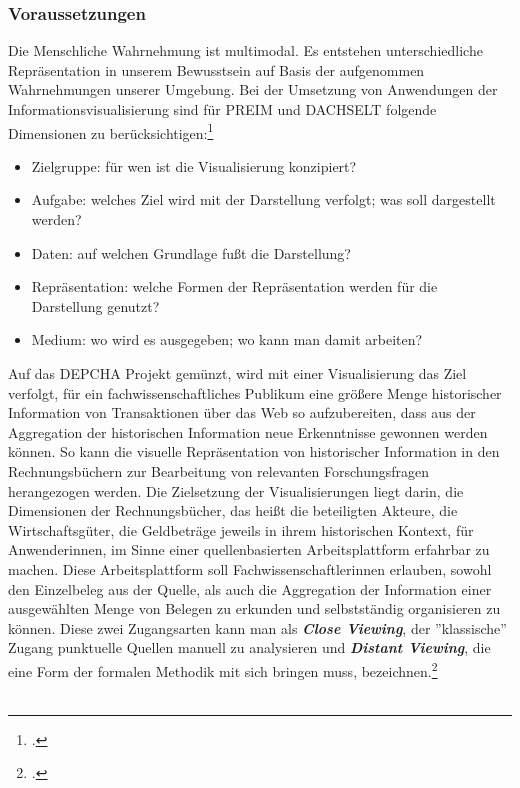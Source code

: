 \documentclass[12pt,a4paper]{article}
\begin{document}
\subsubsection{Voraussetzungen}

Die Menschliche Wahrnehmung ist multimodal. Es entstehen unterschiedliche Repräsentation in unserem Bewusstsein auf Basis der aufgenommen Wahrnehmungen unserer Umgebung. Bei der Umsetzung von Anwendungen der Informationsvisualisierung sind für PREIM und DACHSELT folgende Dimensionen zu berücksichtigen:\footcite[][S.437-440]{preim2010interaktive}
\begin{itemize}
    \item Zielgruppe: für wen ist die Visualisierung konzipiert?
    \item Aufgabe: welches Ziel wird mit der Darstellung verfolgt; was soll dargestellt werden?
    \item Daten: auf welchen Grundlage fußt die Darstellung?
    \item Repräsentation: welche Formen der Repräsentation werden für die Darstellung genutzt?
    \item Medium: wo wird es ausgegeben; wo kann man damit arbeiten?
\end{itemize}
Auf das DEPCHA Projekt gemünzt, wird mit einer Visualisierung das Ziel verfolgt, für ein fachwissenschaftliches Publikum eine größere Menge historischer Information von Transaktionen über das Web so aufzubereiten,  dass aus der Aggregation der historischen Information neue Erkenntnisse gewonnen werden können. So kann die visuelle Repräsentation von historischer Information in den Rechnungsbüchern zur Bearbeitung von relevanten Forschungsfragen herangezogen werden. Die Zielsetzung der Visualisierungen liegt darin, die Dimensionen der Rechnungsbücher, das heißt die beteiligten Akteure, die Wirtschaftsgüter, die Geldbeträge jeweils in ihrem historischen Kontext, für Anwenderinnen, im Sinne einer quellenbasierten Arbeitsplattform erfahrbar zu machen. Diese Arbeitsplattform soll Fachwissenschaftlerinnen erlauben, sowohl den Einzelbeleg aus der Quelle, als auch die Aggregation der Information einer ausgewählten Menge von Belegen zu erkunden und selbstständig organisieren zu können. Diese zwei Zugangsarten kann man als \textbf{\textit{Close Viewing}}, der ''klassische'' Zugang punktuelle Quellen manuell zu analysieren und \textbf{\textit{Distant Viewing}}, die eine Form der formalen Methodik mit sich bringen muss, bezeichnen.\footcite[][]{hsozkult2014closereading} 
\\
\\
\end{document}

